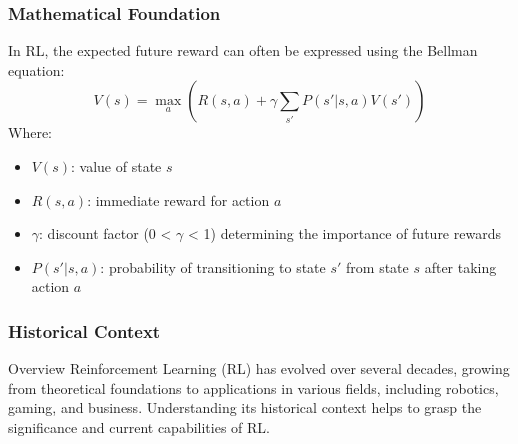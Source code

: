 \documentclass[aspectratio=169]{beamer}
\begin{document}
\begin{frame}[fragile]
    \frametitle{Mathematical Foundation}
    In RL, the expected future reward can often be expressed using the Bellman equation:
    \begin{equation}
        V(s) = \max_a \left( R(s, a) + \gamma \sum_{s'} P(s'|s, a)V(s') \right)
    \end{equation}
    Where:
    \begin{itemize}
        \item \( V(s) \): value of state \( s \)
        \item \( R(s, a) \): immediate reward for action \( a \)
        \item \( \gamma \): discount factor (0 < \( \gamma \) < 1) determining the importance of future rewards
        \item \( P(s'|s, a) \): probability of transitioning to state \( s' \) from state \( s \) after taking action \( a \)
    \end{itemize}
\end{frame}

\begin{frame}[fragile]
    \frametitle{Historical Context}
    \begin{block}{Overview}
        Reinforcement Learning (RL) has evolved over several decades, growing from theoretical foundations to applications in various fields, including robotics, gaming, and business. Understanding its historical context helps to grasp the significance and current capabilities of RL.
    \end{block}
\end{frame}
\end{document}
